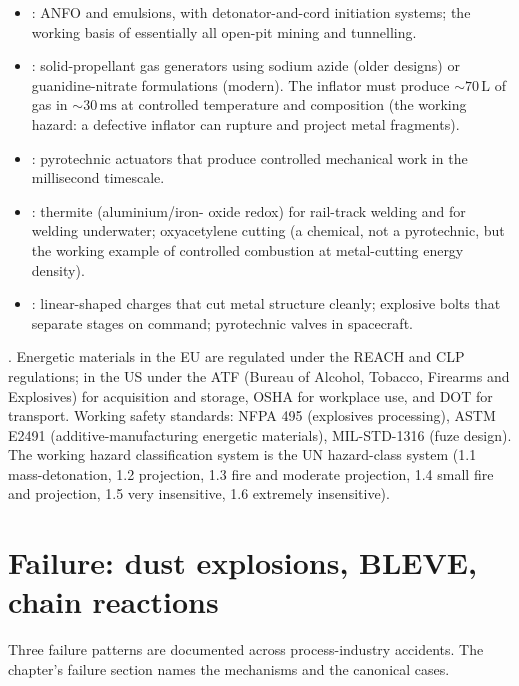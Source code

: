 \begin{itemize}[leftmargin=*]
\item {}: ANFO and
  emulsions, with detonator-and-cord initiation systems; the working
  basis of essentially all open-pit mining and tunnelling.
\item {}: solid-propellant gas
  generators using sodium azide (older designs) or guanidine-nitrate
  formulations (modern). The inflator must produce $\sim 70\,\text{L}$
  of gas in $\sim 30\,\text{ms}$ at controlled temperature and
  composition (the working hazard: a defective inflator can rupture
  and project metal fragments).
\item {}: pyrotechnic actuators that produce controlled
  mechanical work in the millisecond timescale.
\item {}: thermite (aluminium/iron-
  oxide redox) for rail-track welding and for welding underwater;
  oxyacetylene cutting (a chemical, not a pyrotechnic, but the working
  example of controlled combustion at metal-cutting energy density).
\item {}: linear-shaped
  charges that cut metal structure cleanly; explosive bolts that
  separate stages on command; pyrotechnic valves in spacecraft.
\end{itemize}

. Energetic materials in the EU are
regulated under the REACH and CLP regulations; in the US under the
ATF (Bureau of Alcohol, Tobacco, Firearms and Explosives) for
acquisition and storage, OSHA for workplace use, and DOT for
transport. Working safety standards: NFPA 495 (explosives processing),
ASTM E2491 (additive-manufacturing energetic materials), MIL-STD-1316
(fuze design). The working hazard classification system is the UN
hazard-class system (1.1 mass-detonation, 1.2 projection, 1.3 fire and
moderate projection, 1.4 small fire and projection, 1.5 very insensitive,
1.6 extremely insensitive).

\section{Failure: dust explosions, BLEVE, chain reactions}

Three failure patterns are documented across process-industry
accidents. The chapter's failure section names the mechanisms and the
canonical cases.

